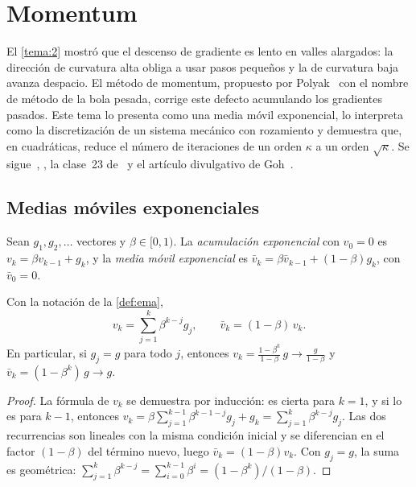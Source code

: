 \chapter{Momentum}
\label{tema:4}

El \cref{tema:2} mostró que el descenso de gradiente es lento en valles alargados: la dirección de curvatura alta obliga a usar pasos pequeños y la de curvatura baja avanza despacio. El método de momentum, propuesto por Polyak~\cite{polyak} con el nombre de método de la bola pesada, corrige este defecto acumulando los gradientes pasados. Este tema lo presenta como una media móvil exponencial, lo interpreta como la discretización de un sistema mecánico con rozamiento y demuestra que, en cuadráticas, reduce el número de iteraciones de un orden $\kappa$ a un orden $\sqrt\kappa$. Se sigue~\cite[§12.6]{d2l}, \cite[§8.3.2 y §8.3.3]{gbc}, la clase~23 de~\cite{mit18065} y el artículo divulgativo de Goh~\cite{goh}.

\section{Medias móviles exponenciales}

\begin{definicion}\label{def:ema}
Sean $g_1,g_2,\dots$ vectores y $\beta\in[0,1)$. La \emph{acumulación exponencial} con $v_0=0$ es $v_k=\beta v_{k-1}+g_k$, y la \emph{media móvil exponencial} es $\bar v_k=\beta\bar v_{k-1}+(1-\beta)g_k$, con $\bar v_0=0$.
\end{definicion}

\begin{proposicion}\label{prop:ema}
Con la notación de la \cref{def:ema},
\[
v_k=\sum_{j=1}^{k}\beta^{k-j}g_j,\qquad \bar v_k=(1-\beta)\,v_k.
\]
En particular, si $g_j=g$ para todo $j$, entonces $v_k=\frac{1-\beta^{k}}{1-\beta}\,g\to\frac{g}{1-\beta}$ y $\bar v_k=(1-\beta^{k})\,g\to g$.
\end{proposicion}

\begin{proof}
La fórmula de $v_k$ se demuestra por inducción: es cierta para $k=1$, y si lo es para $k-1$, entonces $v_k=\beta\sum_{j=1}^{k-1}\beta^{k-1-j}g_j+g_k=\sum_{j=1}^{k}\beta^{k-j}g_j$. Las dos recurrencias son lineales con la misma condición inicial y se diferencian en el factor $(1-\beta)$ del término nuevo, luego $\bar v_k=(1-\beta)v_k$. Con $g_j=g$, la suma es geométrica: $\sum_{j=1}^{k}\beta^{k-j}=\sum_{i=0}^{k-1}\beta^{i}=(1-\beta^{k})/(1-\beta)$.
\end{proof}

